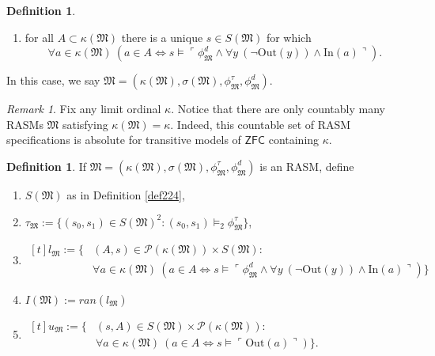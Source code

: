 \documentclass[12pt, twoside]{memoir}
\numberwithin{equation}{section}
\theoremstyle{definition}
\newtheorem{defi}[thm]{Definition}
\theoremstyle{remark}
\newtheorem{rem}[thm]{Remark}
\theoremstyle{definition}
\theoremstyle{definition}
\theoremstyle{definition}
\theoremstyle{remark}
\begin{document}
\begin{defi}
\begin{enumerate}[label=(D\arabic*)]
    \item for all $A \subset \kappa(\mathfrak{M})$ there is a unique $s \in S(\mathfrak{M})$ for which
    \begin{equation*}
        \forall a \in \kappa(\mathfrak{M}) \ (a \in A \iff s \models \ulcorner \phi^d_{\mathfrak{M}} \wedge \forall y \ (\neg \mathrm{Out}(y)) \wedge \mathrm{In}(a) \urcorner) \text{.}
    \end{equation*}
\end{enumerate}
In this case, we say $\mathfrak{M} = (\kappa(\mathfrak{M}), \sigma(\mathfrak{M}), \phi^{\tau}_{\mathfrak{M}}, \phi^d_{\mathfrak{M}})$.
\end{defi}

\begin{rem}\label{rem225}
Fix any limit ordinal $\kappa$. Notice that there are only countably many RASMs $\mathfrak{M}$ satisfying $\kappa(\mathfrak{M}) = \kappa$. Indeed, this countable set of RASM specifications is absolute for transitive models of $\mathsf{ZFC}$ containing $\kappa$.
\end{rem}

\begin{defi}
If $\mathfrak{M} = (\kappa(\mathfrak{M}), \sigma(\mathfrak{M}), \phi^{\tau}_{\mathfrak{M}}, \phi^d_{\mathfrak{M}})$ is an RASM, define 
\begin{enumerate}[label=(\arabic*)]
    \item $S(\mathfrak{M})$ as in Definition \ref{def224},
    \item $\tau_{\mathfrak{M}} := \{(s_0, s_1) \in S(\mathfrak{M})^2 : (s_0, s_1) \models_2 \phi^{\tau}_{\mathfrak{M}}\}$,
    \item 
    \!
    $\begin{aligned}[t]
       l_{\mathfrak{M}} := \{ & (A, s) \in \mathcal{P}(\kappa(\mathfrak{M})) \times S(\mathfrak{M}) : \\
       & \forall a \in \kappa(\mathfrak{M}) \ (a \in A \iff s \models \ulcorner \phi^d_{\mathfrak{M}} \wedge \forall y \ (\neg \mathrm{Out}(y)) \wedge \mathrm{In}(a) \urcorner)\} 
    \end{aligned}$
    \item $I(\mathfrak{M}) := ran(l_{\mathfrak{M}})$
    \item 
    \!
    $\begin{aligned}[t]
        u_{\mathfrak{M}} := \{ & (s, A) \in S(\mathfrak{M}) \times \mathcal{P}(\kappa(\mathfrak{M})) : \\
        & \forall a \in \kappa(\mathfrak{M}) \ (a \in A \iff s \models \ulcorner \mathrm{Out}(a) \urcorner)\} \text{.}
    \end{aligned}$
\end{enumerate}
\end{defi}
\end{document}
